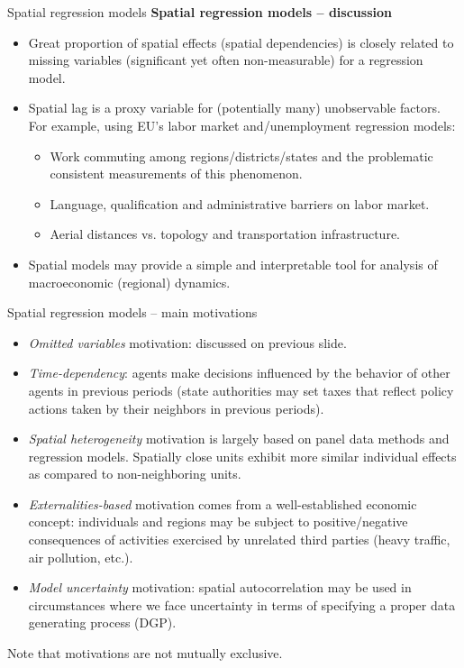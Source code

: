 \documentclass{beamer}
\begin{document}
\begin{frame}{Spatial regression models}
\textbf{Spatial regression models -- discussion}
\medskip
\begin{itemize}
	\item Great proportion of spatial effects (spatial dependencies) is closely related to missing variables (significant yet often non-measurable) for a regression model.
	\smallskip
	\item Spatial lag is a proxy variable for (potentially many) unobservable factors. For example, using EU's labor market and/unemployment regression models:
	\smallskip
	\begin{itemize}
		\item Work commuting among regions/districts/states and the problematic consistent measurements of this phenomenon.
		\smallskip
		\item Language, qualification and administrative barriers on labor market.
		\smallskip
		\item Aerial distances vs. topology and transportation infrastructure.
	\end{itemize}
	\smallskip
	\item Spatial models may provide a simple and interpretable tool for analysis of macroeconomic (regional) dynamics.
\end{itemize}
\end{frame}
\begin{frame}{Spatial regression models -- main motivations}
\vspace{-0.2cm}
\begin{itemize}
\item \textit{Omitted variables} motivation: discussed on previous slide.
\smallskip
\item \textit{Time-dependency}: agents make decisions influenced by the behavior of other agents in previous periods (state authorities may set taxes that reflect policy actions taken by their neighbors in previous periods).
\smallskip
\item \textit{Spatial heterogeneity} motivation is largely based on panel data methods and regression models. Spatially close units exhibit more similar individual effects as compared to non-neighboring units. 
\smallskip
\item \textit{Externalities-based} motivation comes from a well-established economic concept: individuals and regions may be subject to positive/negative consequences of activities exercised by unrelated third parties (heavy traffic, air pollution, etc.).
\smallskip
\item \textit{Model uncertainty} motivation: spatial autocorrelation may be used in circumstances where we face uncertainty in terms of specifying a proper data generating process (DGP). 
\end{itemize} 
Note that motivations are not mutually exclusive.
\end{frame}
\end{document}
